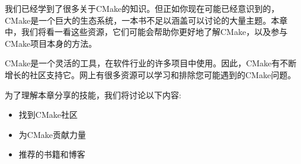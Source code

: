 我们已经学到了很多关于CMake的知识。但正如你现在可能已经意识到的，CMake是一个巨大的生态系统，一本书不足以涵盖可以讨论的大量主题。本章中，我们将看一看这些资源，它们可能会帮助你更好地了解CMake，以及参与CMake项目本身的方法。

CMake是一个灵活的工具，在软件行业的许多项目中使用。因此，CMake有不断增长的社区支持它。网上有很多资源可以学习和排除您可能遇到的CMake问题。

为了理解本章分享的技能，我们将讨论以下内容:

\begin{itemize}
\item 
找到CMake社区

\item 
为CMake贡献力量

\item 
推荐的书籍和博客
\end{itemize}
